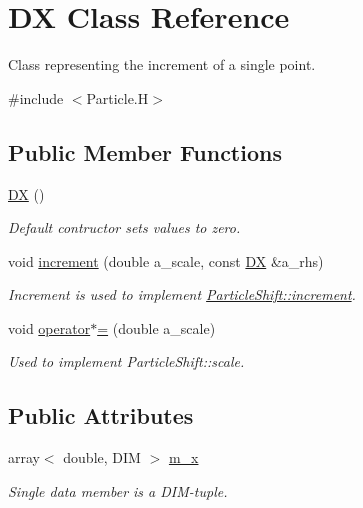 \hypertarget{class_d_x}{}\section{DX Class Reference}
\label{class_d_x}


Class representing the increment of a single point.  




{\ttfamily \#include $<$Particle.\+H$>$}

\subsection*{Public Member Functions}
\begin{DoxyCompactItemize}
\item 
\mbox{\label{class_d_x_ade412c27480b5a80551093e29a538e4d}} 
\hyperlink{class_d_x_ade412c27480b5a80551093e29a538e4d}{DX} ()
\begin{DoxyCompactList}\small\item\em Default contructor sets values to zero. \end{DoxyCompactList}\item 
\mbox{\label{class_d_x_a2c99e2bcc855b0a3bcd738f98a3ce4eb}} 
void \hyperlink{class_d_x_a2c99e2bcc855b0a3bcd738f98a3ce4eb}{increment} (double a\+\_\+scale, const \hyperlink{class_d_x}{DX} \&a\+\_\+rhs)
\begin{DoxyCompactList}\small\item\em Increment is used to implement \hyperlink{class_particle_shift_a6f49ef57c1b4a140abacaca103572be3}{Particle\+Shift\+::increment}. \end{DoxyCompactList}\item 
void \hyperlink{class_d_x_a04524b576388b047b07c36a9d2e6bcb4}{operator$\ast$=} (double a\+\_\+scale)
\begin{DoxyCompactList}\small\item\em Used to implement Particle\+Shift\+::scale. \end{DoxyCompactList}\end{DoxyCompactItemize}
\subsection*{Public Attributes}
\begin{DoxyCompactItemize}
\item 
\mbox{\label{class_d_x_acb8f71fa6e616bf4c15d5638846e667c}} 
array$<$ double, D\+IM $>$ \hyperlink{class_d_x_acb8f71fa6e616bf4c15d5638846e667c}{m\+\_\+x}
\begin{DoxyCompactList}\small\item\em Single data member is a D\+I\+M-\/tuple. \end{DoxyCompactList}\end{DoxyCompactItemize}


